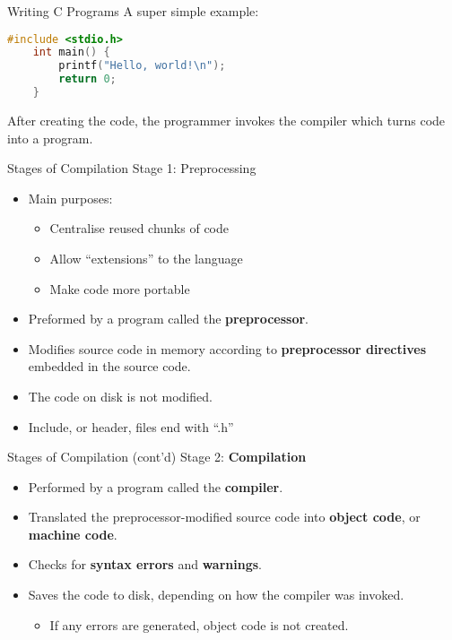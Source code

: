 \documentclass[graphics]{beamer}
\begin{document}
\begin{frame}[fragile]{Writing C Programs}
    A super simple example:
    \begin{lstlisting}[language=c,showspaces=false,keywordstyle=\color{magenta},stringstyle=\color{purple},basicstyle=\ttfamily\footnotesize,numberstyle=\tiny\color{codegray},commentstyle=\color{green},]
    #include <stdio.h>
    int main() {
        printf("Hello, world!\n");
        return 0;
    }
    \end{lstlisting}
    After creating the code, the programmer invokes the compiler which turns code into a program.
\end{frame}

\begin{frame}{Stages of Compilation}
    Stage 1: Preprocessing
    \begin{itemize}
        \item Main purposes:
        \begin{itemize}
            \item Centralise reused chunks of code
            \item Allow ``extensions'' to the language
            \item Make code more portable
        \end{itemize}
        \item Preformed by a program called the \textbf{preprocessor}.
        \item Modifies source code in memory according to \textbf{preprocessor directives} embedded in the source code.
        \item The code on disk is not modified.
        \item Include, or header, files end with ``.h'' 
    \end{itemize}
\end{frame}

\begin{frame}{Stages of Compilation (cont'd)}
    Stage 2: \textbf{Compilation}
    \begin{itemize}
        \item Performed by a program called the \textbf{compiler}.
        \item Translated the preprocessor-modified source code into \textbf{object code}, or \textbf{machine code}.
        \item Checks for \textbf{syntax errors} and \textbf{warnings}.
        \item Saves the code to disk, depending on how the compiler was invoked.
        \begin{itemize}
            \item If any errors are generated, object code is not created.
        \end{itemize}
    \end{itemize}
\end{frame}
\end{document}

